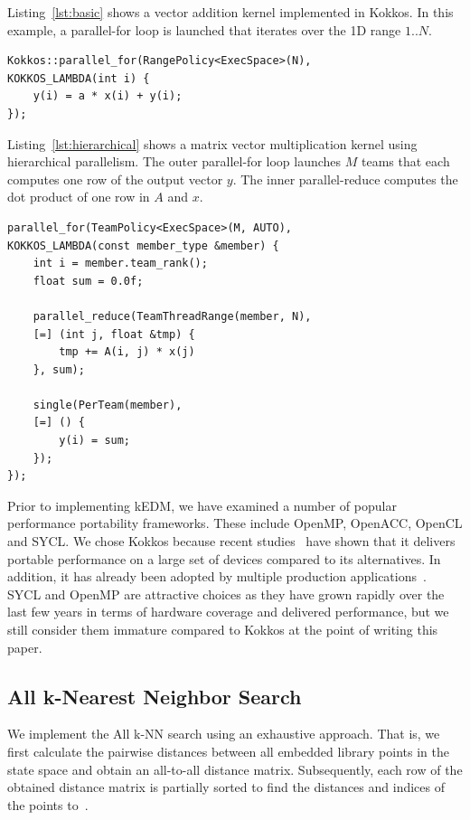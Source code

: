 \documentclass[conference]{IEEEtran}
\begin{document}
Listing~\ref{lst:basic} shows a vector addition  kernel implemented in Kokkos.
In this example, a parallel-for loop is launched that iterates over the 1D
range $1..N$.

\begin{lstlisting}[caption={Basic data parallel loop},label={lst:basic}]
Kokkos::parallel_for(RangePolicy<ExecSpace>(N),
KOKKOS_LAMBDA(int i) {
    y(i) = a * x(i) + y(i);
});
\end{lstlisting}

Listing~\ref{lst:hierarchical} shows a matrix vector multiplication kernel
using hierarchical parallelism. The outer parallel-for loop launches $M$ teams
that each computes one row of the output vector $y$. The inner parallel-reduce
computes the dot product of one row in $A$ and $x$.

\begin{lstlisting}[caption={Hierarchical data parallel loop},label={lst:hierarchical}]
parallel_for(TeamPolicy<ExecSpace>(M, AUTO),
KOKKOS_LAMBDA(const member_type &member) {
    int i = member.team_rank();
    float sum = 0.0f;

    parallel_reduce(TeamThreadRange(member, N),
    [=] (int j, float &tmp) {
        tmp += A(i, j) * x(j)
    }, sum);

    single(PerTeam(member),
    [=] () {
        y(i) = sum;
    });
});
\end{lstlisting}

Prior to implementing kEDM, we have examined a number of popular performance
portability frameworks. These include OpenMP, OpenACC, OpenCL and SYCL\@. We
chose Kokkos  because recent studies~\cite{Martineau2017, Deakin2019, Deakin2020}
have shown that it delivers portable performance on a large set of devices
compared to its alternatives. In addition, it has already been adopted by
multiple production applications~\cite{Sprague2020,Holmen2017,Demeshko2019}.
SYCL and OpenMP are attractive choices as they have grown rapidly over the
last few years in terms of hardware coverage and delivered performance, but we
still consider them immature compared to Kokkos at the point of writing this
paper.

\subsection{All k-Nearest Neighbor Search}

We implement the All k-NN search using an exhaustive approach. That is, we
first calculate the pairwise distances between all embedded library points in
the state space and obtain an all-to-all distance matrix. Subsequently, each
row of the obtained distance matrix is partially sorted to find the distances
and indices of the points
to~\cite{Garcia2008,Garcia2010}.
\end{document}
